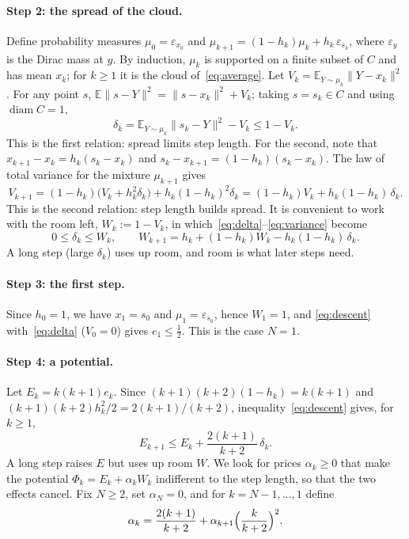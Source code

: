 \documentclass[11pt]{article}
\theoremstyle{remark}
\newcommand{\E}{\mathbb{E}}
\begin{document}
\paragraph{Step 2: the spread of the cloud.}
Define probability measures $\mu_0=\varepsilon_{x_0}$ and
$\mu_{k+1}=(1-h_k)\mu_k+h_k\,\varepsilon_{s_k}$, where $\varepsilon_y$ is the Dirac
mass at $y$. By induction, $\mu_k$ is supported on a finite subset of $C$ and has
mean $x_k$; for $k\ge1$ it is the cloud of~\eqref{eq:average}. Let
$V_k=\E_{Y\sim\mu_k}\|Y-x_k\|^2$. For any point $s$,
$\E\|s-Y\|^2=\|s-x_k\|^2+V_k$; taking $s=s_k\in C$ and using $\operatorname{diam}C=1$,
\begin{equation}\label{eq:delta}
  \delta_k=\E_{Y\sim\mu_k}\|s_k-Y\|^2-V_k\le1-V_k .
\end{equation}
This is the first relation: spread limits step length. For the second, note that
$x_{k+1}-x_k=h_k(s_k-x_k)$ and $s_k-x_{k+1}=(1-h_k)(s_k-x_k)$. The law of total
variance for the mixture $\mu_{k+1}$ gives
\begin{equation}\label{eq:variance}
  V_{k+1}=(1-h_k)\bigl(V_k+h_k^2\delta_k\bigr)+h_k(1-h_k)^2\delta_k
  =(1-h_k)V_k+h_k(1-h_k)\,\delta_k .
\end{equation}
This is the second relation: step length builds spread. It is convenient to work
with the room left, $W_k:=1-V_k$, in which~\eqref{eq:delta}--\eqref{eq:variance}
become
\begin{equation}\label{eq:room}
  0\le\delta_k\le W_k,\qquad
  W_{k+1}=h_k+(1-h_k)W_k-h_k(1-h_k)\,\delta_k .
\end{equation}
A long step (large $\delta_k$) uses up room, and room is what later steps need.

\paragraph{Step 3: the first step.}
Since $h_0=1$, we have $x_1=s_0$ and $\mu_1=\varepsilon_{s_0}$, hence $W_1=1$, and
\eqref{eq:descent} with~\eqref{eq:delta} ($V_0=0$) gives $e_1\le\frac12$. This is
the case $N=1$.

\paragraph{Step 4: a potential.}
Let $E_k=k(k+1)e_k$. Since $(k+1)(k+2)(1-h_k)=k(k+1)$ and
$(k+1)(k+2)h_k^2/2=2(k+1)/(k+2)$, inequality~\eqref{eq:descent} gives, for $k\ge1$,
\begin{equation}\label{eq:E}
  E_{k+1}\le E_k+\frac{2(k+1)}{k+2}\,\delta_k .
\end{equation}
A long step raises $E$ but uses up room $W$. We look for prices $\alpha_k\ge0$ that
make the potential $\Phi_k=E_k+\alpha_kW_k$ indifferent to the step length, so
that the two effects cancel. Fix $N\ge2$, set $\alpha_N=0$, and for
$k=N-1,\dots,1$ define
\begin{equation}\label{eq:alpha}
  \alpha_k=\frac{2(k+1)}{k+2}+\alpha_{k+1}\Bigl(\frac{k}{k+2}\Bigr)^2 .
\end{equation}
\end{document}
